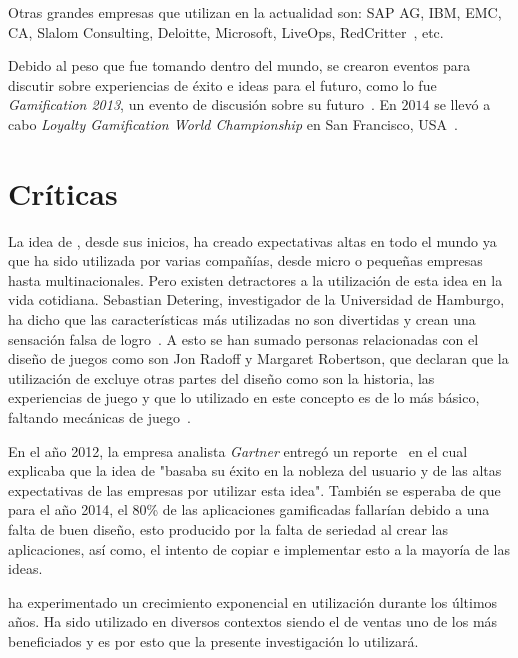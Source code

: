 Otras grandes empresas que utilizan {\gam} en la actualidad son:
SAP AG, IBM, EMC, CA, Slalom Consulting, Deloitte, Microsoft, LiveOps,
RedCritter~\cite{Gam:Companies:1}, etc.

Debido al peso que {\GAM} fue tomando dentro del mundo,
se crearon eventos para discutir sobre experiencias de éxito e ideas para
el futuro, como lo fue \emph{Gamification 2013},
un evento de discusión sobre su futuro~\cite{Gam:Events:1}.
En $2014$ se llevó a cabo \emph{Loyalty Gamification World Championship}
en San Francisco, USA~\cite{Gam:Events:2}. 

\section{Críticas}

La idea de {\gam}, desde sus inicios, ha creado expectativas altas en todo el mundo
ya que ha sido utilizada por varias compañías, desde micro o pequeñas empresas
hasta multinacionales.
Pero existen detractores a la utilización de esta idea en la vida cotidiana.
Sebastian Detering, investigador de la Universidad de Hamburgo, ha dicho que las
características más utilizadas no son divertidas y crean una sensación falsa de
logro~\cite{Gam:Crit:1}.
A esto se han sumado personas relacionadas con el diseño de juegos como son
Jon Radoff y Margaret Robertson,  que declaran que la utilización de {\gam}
excluye otras partes del diseño como son la historia, las experiencias de juego
y que lo utilizado en este concepto es de lo más básico, faltando mecánicas de
juego~\cite{Gam:Crit:2}.

En el año 2012, la empresa analista \emph{Gartner} entregó un
reporte~\cite{Gam:Crit:3} en el cual explicaba que la idea de {\gam}
"basaba su éxito en la nobleza del usuario y de las altas expectativas
de las empresas por utilizar esta idea".
También se esperaba de que para el año 2014, el 80\% de las aplicaciones
gamificadas fallarían debido a una falta de buen diseño,
esto producido por la falta de seriedad al crear las aplicaciones,
así como, el intento de copiar e implementar esto a la mayoría de las ideas.

{\GAM} ha experimentado un crecimiento exponencial en utilización durante los últimos 
años. Ha sido utilizado en diversos contextos siendo el de ventas uno de los más beneficiados
 y es por esto que la presente investigación lo utilizará.
